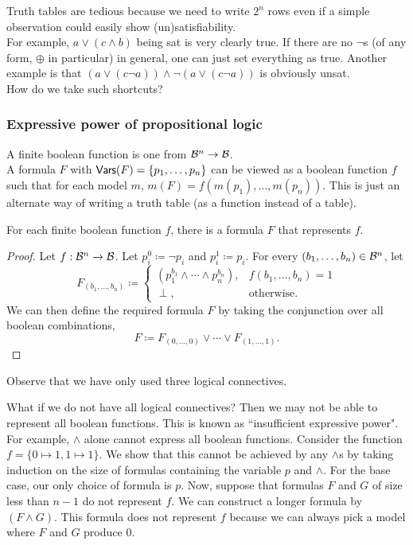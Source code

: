 Truth tables are tedious because we need to write $2^n$ rows even if a simple observation could easily show (un)satisfiability.\\
For example, $a \vee (c \wedge b)$ being sat is very clearly true. If there are no $\neg$s (of any form, $\oplus$ in particular) in general, one can just set everything as true. Another example is that $(a \vee (c \neg a))\wedge\neg (a \vee (c \neg a))$ is obviously unsat.\\
How do we take such shortcuts?

\subsubsection{Expressive power of propositional logic}

A finite boolean function is one from $\mathcal{B}^n\to\mathcal{B}$.\\
A formula $F$ with $\mathsf{Vars}(F)=\{p_1,\ldots,p_n\}$ can be viewed as a boolean function $f$ such that for each model $m$, $m(F)=f(m(p_1),\ldots,m(p_n))$. This is just an alternate way of writing a truth table (as a function instead of a table).

\begin{theorem}
For each finite boolean function $f$, there is a formula $F$ that represents $f$.
\end{theorem}
\begin{proof}
Let $f:\mathcal{B}^n\to\mathcal{B}$. Let $p_i^0\coloneqq\neg p_i$ and $p_i^1\coloneqq p_i$. For every $(b_1,\ldots,b_n)\in\mathcal{B}^n$, let
\[
    F_{(b_1,\ldots,b_n)} \coloneqq
    \begin{cases}
        (p_1^{b_1}\wedge\cdots\wedge p_n^{b_n}), & f(b_1,\ldots,b_n)=1 \\
        \perp, & \text{otherwise.}
    \end{cases}
\]
We can then define the required formula $F$ by taking the conjunction over all boolean combinations,
\[ F \coloneqq F_{(0,\ldots,0)} \vee \cdots \vee F_{(1,\ldots,1)}. \]
\end{proof}

Observe that we have only used three logical connectives.

What if we do not have all logical connectives? Then we may not be able to represent all boolean functions. This is known as ``insufficient expressive power".\\

For example, $\wedge$ alone cannot express all boolean functions. Consider the function $f=\{0\mapsto 1, 1\mapsto 1\}$. We show that this cannot be achieved by any $\wedge$s by taking induction on the size of formulas containing the variable $p$ and $\wedge$. For the base case, our only choice of formula is $p$. Now, suppose that formulas $F$ and $G$ of size less than $n-1$ do not represent $f$. We can construct a longer formula by $(F\wedge G)$. This formula does not represent $f$ because we can always pick a model where $F$ and $G$ produce $0$.

